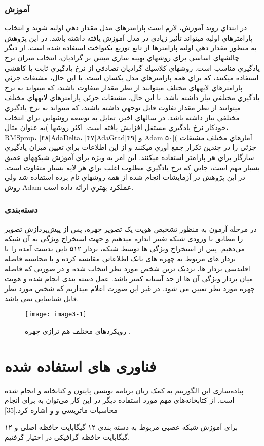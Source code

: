 \subsubsection{آموزش‌}
در ابتداي روند آموزش، لازم است پارامترهاي مدل مقدار دهي اوليه شوند و انتخاب پارامترهاي اوليه ميتواند تأثير زيادي در مدل آموزش يافته داشته باشد. در اين پژوهش به منظور مقدار دهي اوليه پارامترها از تابع توزيع يكنواخت استفاده شده است. از ديگر چالشهاي اساسي براي روشهاي بهينه سازي مبتني بر گراديان، انتخاب ميزان نرخ يادگيري مناسب است. روشهاي كلاسيك گراديان تصادفي از نرخ يادگيري ثابت يا كاهشي استفاده ميكنند، كه براي همه پارامترهاي مدل يكسان است. با اين حال، مشتقات جزئي پارامترهاي لايههاي مختلف ميتوانند از نظر مقدار متفاوت باشند، كه ميتواند به نرخ يادگيري مختلفي نياز داشته باشد. با اين حال، مشتقات جزئي پارامترهاي لايههاي مختلف ميتوانند از نظر مقدار تفاوت قابل توجهي داشته باشند، كه ميتواند به نرخ يادگيري مختلفي نياز داشته باشد. در سالهاي اخير، تمايل به توسعه روشهايي براي انتخاب خودكار نرخ يادگيري مستقل افزايش يافته است. اكثر روشها )به عنوان مثال، RMSprop، [۴۸]AdaDelta، [۴۷]AdaGrad]۴۹[ و Adam]۵۰[( آمارهاي مختلف مشتقات جزئي را در چندين تكرار جمع آوري ميكنند و از اين اطلاعات براي تعيين ميزان يادگيري سازگار براي هر پارامتر استفاده ميكنند. اين امر به ويژه براي آموزش شبكههاي عميق بسيار مهم است، جايي كه نرخ يادگيري مطلوب اغلب براي هر لايه بسيار متفاوت است. در اين پژوهش در آزمايشات انجام شده از همه روشهاي نام برده استفاده شد ولي روش Adam عملكرد بهتري ارائه داده است.

\subsubsection{دسته‌بندی}
در مرحله آزمون به منظور تشخیص هویت یک تصویر چهره، پس از پیش‌پردازش تصویر را مطابق با ورودی شبکه تغییر اندازه میدهیم و جهت استخراج ویژگی‌ به آن شبکه می‌دهیم. پس از استخراج ویژگی ها توسط شبکه، بردار ۵۱۲ تایی بدست آمده را با بردار های مربوط به چهره های بانک اطلاعاتی مقایسه کرده و با محاسبه فاصله اقلیدسی بردار ها، نزدیک ترین شخص مورد نظر انتخاب شده و در صورتی که فاصله میان بردار ویژگی آن ها از حد آستانه کمتر باشد. عمل دسته بندی انجام شده و هویت چهره مورد نظر تعیین می شود. در غیر این صورت اعلام میداریم که شخص مورد نظر قابل شناسایی نمی باشد.

\begin{figure}[h]
\centering
  \texttt{[image: image3-1]}
  \caption{رویکردهای مختلف هم ترازی چهره \cite{ref1}.}
  \label{image2-1}
\end{figure}

\section{فناوری های استفاده شده}
پیاده‌سازی این الگوریتم به کمک زبان برنامه‌ نویسی پایتون و کتابخانه  و انجام شده است. از کتابخانه‌های مهم مورد استفاده دیگر در این کار می‌‌توان به  برای انجام محاسبات ماتریسی و  و  اشاره کرد.[35] 

برای آموزش شبکه عصبی مربوط به دسته بندی ۱۲ گیگابایت حافظه اصلی و ۱۲ گیگابایت حافظه گرافیکی در اختیار گرفتیم.
